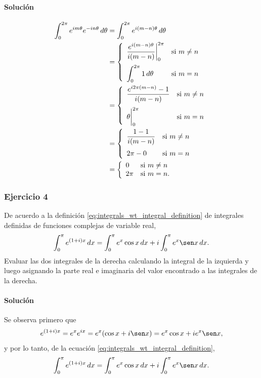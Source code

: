 \documentclass[a4paper]{report}
\begin{document}
\paragraph{Solución} 
\begin{align*}
 \int_0^{2\pi}e^{im\theta}e^{-in\theta}\,d\theta&=\int_0^{2\pi}e^{i(m-n)\theta}\,d\theta\\
  &=\left\{ 
 \begin{array}{ll}
  \dfrac{e^{i(m-n)\theta}}{i(m-n)}\bigg|_0^{2\pi} & \textrm{si }m\neq n\\[\bigskipamount]
  \displaystyle\int_0^{2\pi}1\,d\theta & \textrm{si }m=n
 \end{array}
 \right.\\
 &=\left\{ 
 \begin{array}{ll}
  \dfrac{e^{i2\pi(m-n)}-1}{i(m-n)} & \textrm{si }m\neq n\\[\bigskipamount]
  \theta\bigg|_0^{2\pi} & \textrm{si }m=n
 \end{array}
 \right.\\
 &=\left\{ 
 \begin{array}{ll}
  \dfrac{1-1}{i(m-n)} & \textrm{si }m\neq n\\[\bigskipamount]
  2\pi-0 & \textrm{si }m=n
 \end{array}
 \right.\\
 &=\left\{ 
 \begin{array}{ll}
  0 & \textrm{si }m\neq n\\
  2\pi & \textrm{si }m=n.
 \end{array}
 \right.
\end{align*}
 
 
\subsubsection{Ejercicio 4} 

De acuerdo a la definición \ref{eq:integrals_wt_integral_definition} de integrales definidas de funciones complejas de variable real,
\[
 \int_0^\pi e^{(1+i)x}\,dx=\int_0^\pi e^x\cos x\,dx+i\int_0^\pi e^x\sen x\,dx.
\]
Evaluar las dos integrales de la derecha calculando la integral de la izquierda y luego asignando la parte real e imaginaria del valor encontrado a las integrales de la derecha.

\paragraph{Solución} Se observa primero que 
\[
 e^{(1+i)x}=e^xe^{ix}=e^x(\cos x+i\sen x)=e^x\cos x+ie^x\sen x,
\]
y por lo tanto, de la ecuación \ref{eq:integrals_wt_integral_definition},
\[
 \int_0^\pi e^{(1+i)x}\,dx=\int_0^\pi e^x\cos x\,dx+i\int_0^\pi e^x\sen x\,dx.
\]
\end{document}
